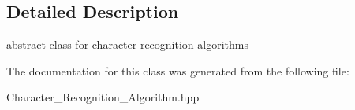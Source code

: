 \subsection{Detailed Description}
abstract class for character recognition algorithms 

The documentation for this class was generated from the following file\+:\begin{DoxyCompactItemize}
\item 
Character\+\_\+\+Recognition\+\_\+\+Algorithm.\+hpp\end{DoxyCompactItemize}
